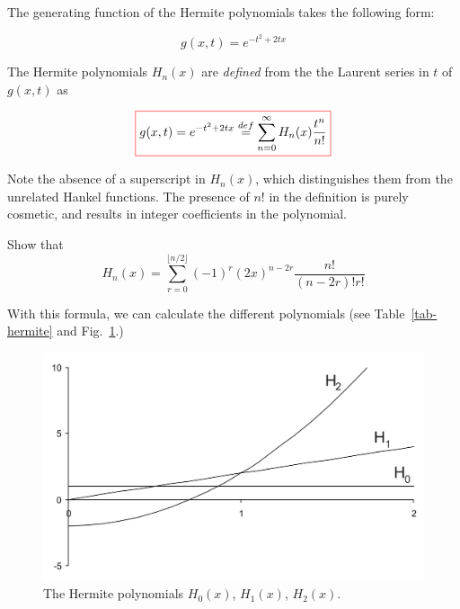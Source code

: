The generating function of the Hermite polynomials takes the following form:

\begin{equation}
g(x,t) = e^{-t^2 + 2tx} \label{eq-gen-hermite}
\end{equation}

The Hermite polynomials $H_n(x)$ are \emph{defined} from the the Laurent series in $t$ of $g(x,t)$ as 

\begin{equation}
\fbox{$\displaystyle
  g(x,t) = e^{-t^2 + 2tx} \stackrel{def}{=} \sum_{n = 0}^{\infty} H_n(x)\frac{t^n}{n!} \label{eq-g-hermite}
$}
\end{equation} 

\noindent{}Note the absence of a superscript in $H_n(x)$, which distinguishes them from the unrelated Hankel functions. The presence of $n!$ in the definition is purely cosmetic, and results in integer coefficients in the polynomial.

\begin{exer}
\noindent{}Show that
$$H_n(x) = \sum_{r=0}^{\lfloor n/2 \rfloor}(-1)^r {(2x)}^{n-2r} \frac{n!}{(n-2r)! r!}$$
\end{exer}

With this formula, we can calculate the different polynomials (see Table~\ref{tab-hermite} and Fig.~\ref{fig-hermite}.)

\begin{figure}
\centering
\includegraphics[scale=0.7]{hermite/figures/hermite}
\caption{The Hermite polynomials $H_0(x)$, $H_1(x)$, $H_2(x)$.}
\label{fig-hermite}
\end{figure}

